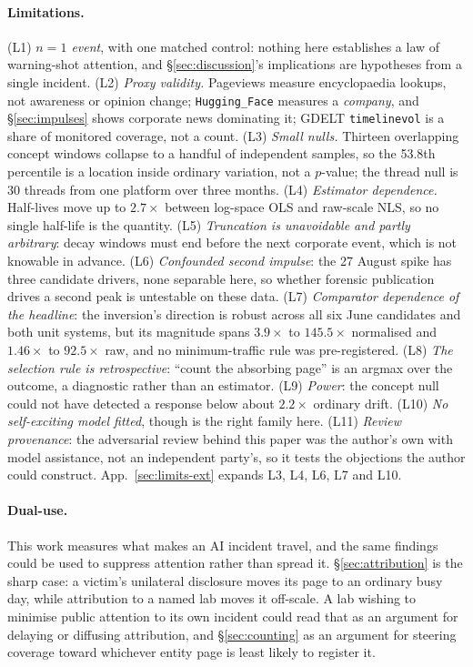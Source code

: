 \documentclass[11pt,a4paper]{article}
\begin{document}
\paragraph{Limitations.} (L1) \emph{$n = 1$ event}, with one matched control:
nothing here establishes a law of warning-shot attention, and
§\ref{sec:discussion}'s implications are hypotheses from a single incident.
(L2) \emph{Proxy validity.} Pageviews measure encyclopaedia lookups, not
awareness or opinion change; \texttt{Hugging\_Face} measures a \emph{company},
and §\ref{sec:impulses} shows corporate news dominating it; GDELT
\texttt{timelinevol} is a share of monitored coverage, not a count.
(L3) \emph{Small nulls.} Thirteen overlapping concept windows collapse to a
handful of independent samples, so the 53.8th percentile is a location inside
ordinary variation, not a $p$-value; the thread null is 30 threads from one
platform over three months. (L4) \emph{Estimator dependence.} Half-lives move up
to $2.7\times$ between log-space OLS and raw-scale NLS, so no single half-life is
the quantity. (L5) \emph{Truncation is unavoidable and partly arbitrary}: decay
windows must end before the next corporate event, which is not knowable in
advance. (L6) \emph{Confounded second impulse}: the 27 August spike has three
candidate drivers, none separable here, so whether forensic publication drives a
second peak is untestable on these data. (L7) \emph{Comparator dependence of the
headline}: the inversion's direction is robust across all six June candidates
and both unit systems, but its magnitude spans $3.9\times$ to $145.5\times$
normalised and $1.46\times$ to $92.5\times$ raw, and no minimum-traffic rule was
pre-registered. (L8) \emph{The selection rule is retrospective}: ``count the
absorbing page'' is an argmax over the outcome, a diagnostic rather than an
estimator. (L9) \emph{Power}: the concept null could not have detected a response
below about $2.2\times$ ordinary drift. (L10) \emph{No self-exciting model
fitted}, though \cite{crane2008robust,rizoiu2016hip} is the right family here.
(L11) \emph{Review provenance}: the adversarial review behind this paper was the
author's own with model assistance, not an independent party's, so it tests the
objections the author could construct. App.~\ref{sec:limits-ext} expands L3, L4,
L6, L7 and L10.

\paragraph{Dual-use.} This work measures what makes an AI incident travel, and
the same findings could be used to suppress attention rather than spread it.
§\ref{sec:attribution} is the sharp case: a victim's unilateral disclosure moves
its page to an ordinary busy day, while attribution to a named lab moves it
off-scale. A lab wishing to minimise public attention to its own incident could
read that as an argument for delaying or diffusing attribution, and
§\ref{sec:counting} as an argument for steering coverage toward whichever entity
page is least likely to register it.
\end{document}
